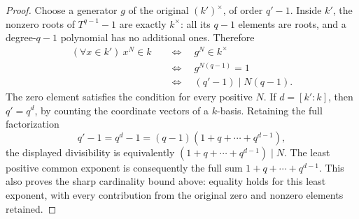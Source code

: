 \begin{proof}
Choose a generator $g$ of the original
$(k')^\times$, of order $q'-1$.
Inside $k'$, the nonzero roots of
$T^{q-1}-1$ are exactly $k^\times$:
all its $q-1$ elements are roots,
and a degree-$q-1$ polynomial has
no additional ones. Therefore
\[

\begin{split}
(\forall x\in k')\ x^N\in k
&\quad\Longleftrightarrow\quad g^N\in k^\times\\
&\quad\Longleftrightarrow\quad g^{N(q-1)}=1\\
&\quad\Longleftrightarrow\quad (q'-1)\mid N(q-1).
\end{split}

\]
The zero element satisfies the condition
for every positive $N$. If $d=[k':k]$,
then $q'=q^d$, by counting the coordinate
vectors of a $k$-basis. Retaining the
full factorization
$$
q'-1=q^d-1=(q-1)(1+q+\cdots+q^{d-1}),
$$
the displayed divisibility is equivalently
$(1+q+\cdots+q^{d-1})\mid N$. The least
positive common exponent is consequently
the full sum $1+q+\cdots+q^{d-1}$.
This also proves the sharp cardinality
bound above: equality holds for this
least exponent, with every contribution
from the original zero and nonzero
elements retained.
\end{proof}